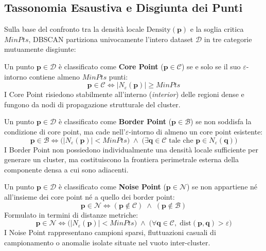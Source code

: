 \subsection{Tassonomia Esaustiva e Disgiunta dei Punti}

Sulla base del confronto tra la densità locale $\mathrm{Density}(\mathbf{p})$ e la soglia critica $MinPts$, DBSCAN partiziona univocamente l'intero dataset $\mathcal{D}$ in tre categorie mutuamente disgiunte:

\begin{definition}
Un punto $\mathbf{p} \in \mathcal{D}$ è classificato come \textbf{Core Point} ($\mathbf{p} \in \mathcal{C}$) se e solo se il suo $\varepsilon$-intorno contiene almeno $MinPts$ punti:
\begin{equation}
    \mathbf{p} \in \mathcal{C} \iff |N_\varepsilon(\mathbf{p})| \ge MinPts
    \label{eq:dm-core-point-condition}
\end{equation}
I Core Point risiedono stabilmente all'interno (\textit{interior}) delle regioni dense e fungono da nodi di propagazione strutturale del cluster.
\end{definition}

\begin{definition}
Un punto $\mathbf{p} \in \mathcal{D}$ è classificato come \textbf{Border Point} ($\mathbf{p} \in \mathcal{B}$) se non soddisfa la condizione di core point, ma cade nell'$\varepsilon$-intorno di almeno un core point esistente:
\begin{equation}
    \mathbf{p} \in \mathcal{B} \iff \Big(|N_\varepsilon(\mathbf{p})| < MinPts\Big) \;\land\; \Big(\exists \mathbf{q} \in \mathcal{C} \text{ tale che } \mathbf{p} \in N_\varepsilon(\mathbf{q})\Big)
    \label{eq:dm-border-point-condition}
\end{equation}
I Border Point non possiedono individualmente una densità locale sufficiente per generare un cluster, ma costituiscono la frontiera perimetrale esterna della componente densa a cui sono adiacenti.
\end{definition}

\begin{definition}
Un punto $\mathbf{p} \in \mathcal{D}$ è classificato come \textbf{Noise Point} ($\mathbf{p} \in \mathcal{N}$) se non appartiene né all'insieme dei core point né a quello dei border point:
\begin{equation}
    \mathbf{p} \in \mathcal{N} \iff (\mathbf{p} \notin \mathcal{C}) \;\land\; (\mathbf{p} \notin \mathcal{B})
    \label{eq:dm-noise-point-condition}
\end{equation}
Formulato in termini di distanze metriche:
\begin{equation}
    \mathbf{p} \in \mathcal{N} \iff \Big(|N_\varepsilon(\mathbf{p})| < MinPts\Big) \;\land\; \Big(\forall \mathbf{q} \in \mathcal{C}, \; \mathrm{dist}(\mathbf{p}, \mathbf{q}) > \varepsilon\Big)
\end{equation}
I Noise Point rappresentano campioni sparsi, fluttuazioni casuali di campionamento o anomalie isolate situate nel vuoto inter-cluster.
\end{definition}


